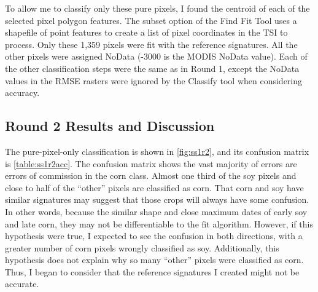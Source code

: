 To allow me to classify only these pure pixels, I found the centroid of each of the selected pixel polygon features. The subset option of the Find Fit Tool uses a shapefile of point features to create a list of pixel coordinates in the TSI to process. Only these 1,359 pixels were fit with the reference signatures. All the other pixels were assigned NoData (-3000 is the MODIS NoData value). Each of the other classification steps were the same as in Round 1, except the NoData values in the RMSE rasters were ignored by the Classify tool when considering accuracy.


\subsection*{Round 2 Results and Discussion}

The pure-pixel-only classification is shown in \autoref{fig:ss1r2}, and its confusion matrix is \autoref{table:ss1r2acc}. The confusion matrix shows the vast majority of errors are errors of commission in the corn class. Almost one third of the soy pixels and close to half of the ``other'' pixels are classified as corn. That corn and soy have similar signatures may suggest that those crops will always have some confusion. In other words, because the similar shape and close maximum dates of early soy and late corn, they may not be differentiable to the fit algorithm. However, if this hypothesis were true, I expected to see the confusion in both directions, with a greater number of corn pixels wrongly classified as soy. Additionally, this hypothesis does not explain why so many ``other'' pixels were classified as corn. Thus, I began to consider that the reference signatures I created might not be accurate.



